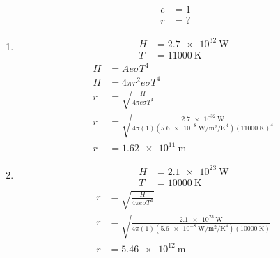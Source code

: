 \documentclass{article}
\begin{document}
\begin{align*}
	e & = 1 \\
	r & = ?
\end{align*}
\begin{enumerate}[label = \boldalph]
	\item
		\begin{align*}
			H & = \SI{2.7e32}{\watt} \\
			T & = \SI{11000}{\kelvin}
		\end{align*}
		\begin{align*}
			H & = Ae\sigma T^4 \\
			H & = 4\pi r^2e\sigma T^4 \\
			r & = \sqrt{ \frac{ H }{ 4\pi e\sigma T^4 } } \\
			r & = \sqrt{ \frac{ \SI{2.7e32}{\watt} }{ 4\pi (1)(\SI{5.6e-8}{\watt \per \meter \squared \per \kelvin \tothe{4}})(\SI{11000}{\kelvin})^4 } } \\
			r & = \SI{1.62e11}{\meter}
		\end{align*}
	\item
		\begin{align*}
			H & = \SI{2.1e23}{\watt} \\
			T & = \SI{10000}{\kelvin}
		\end{align*}
		\begin{align*}
			r & = \sqrt{ \frac{ H }{ 4\pi e\sigma T^4 } } \\
			r & = \sqrt{ \frac{ \SI{2.1e23}{\watt} }{ 4\pi (1)(\SI{5.6e-8}{\watt \per \meter \squared \per \kelvin \tothe{4}})(\SI{10000}{\kelvin}) } } \\
			r & = \SI{5.46e12}{\meter}
		\end{align*}
\end{enumerate}
\end{document}
